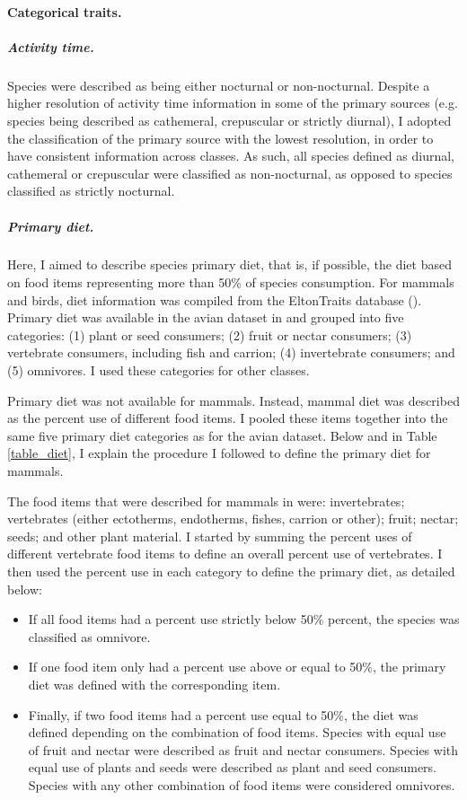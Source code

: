 \paragraph{Categorical traits.}
\subparagraph{Activity time.}
Species were described as being either nocturnal or non-nocturnal. Despite a higher resolution of activity time information in some of the primary sources (e.g. species being described as cathemeral, crepuscular or strictly diurnal), I adopted the classification of the primary source with the lowest resolution, in order to have consistent information across classes.
As such, all species defined as diurnal, cathemeral or crepuscular were classified as non-nocturnal, as opposed to species classified as strictly nocturnal.
\subparagraph{Primary diet.}
Here, I aimed to describe species primary diet, that is, if possible, the diet based on food items representing more than 50\% of species consumption. For mammals and birds, diet information was compiled from the EltonTraits database (\cite{Wilman2014}). Primary diet was available in the avian dataset in \citet{Wilman2014} and grouped into five categories: (1) plant or seed consumers; (2) fruit or nectar consumers; (3) vertebrate consumers, including fish and carrion; (4) invertebrate consumers; and (5) omnivores. I used these categories for other classes.

Primary diet was not available for mammals. Instead, mammal diet was described as the percent use of different food items. I pooled these items together into the same five primary diet categories as for the avian dataset. Below and in Table \ref{table_diet}, I explain the procedure I followed to define the primary diet for mammals.

The food items that were described for mammals in \citet{Wilman2014} were: invertebrates; vertebrates (either ectotherms, endotherms, fishes, carrion or other); fruit; nectar; seeds; and other plant material. I started by summing the percent uses of different vertebrate food items to define an overall percent use of vertebrates. I then used the percent use in each category to define the primary diet, as detailed below:
\begin{itemize}
\item If all food items had a percent use strictly below 50\% percent, the species was classified as omnivore.
\item If one food item only had a percent use above or equal to 50\%, the primary diet was defined with the corresponding item.
\item Finally, if two food items had a percent use equal to 50\%, the diet was defined depending on the combination of food items. Species with equal use of fruit and nectar were described as fruit and nectar consumers.  Species with equal use of plants and seeds were described as plant and seed consumers. Species with any other combination of food items were considered omnivores. 
\end{itemize}


